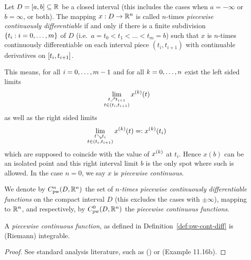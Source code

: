     \begin{definition}\label{def:pw-cont-diff}
        Let $D=[a,b]\subseteq\mathbb{R}$ be a closed interval (this includes the cases when $a=-\infty$ or $b=\infty$, or both). The mapping $x:D\rightarrow\mathbb{R}^n$ is called $n$-times \emph{piecewise continuously differentiable} if and only if there is a finite subdivision $\{t_i:i=0,\ldots,m\}$ of $D$ (i.e.\ $a=t_0<t_1<\ldots<t_m=b$) such that $x$ is $n$-times continuously differentiable on each interval piece $(t_i,t_{i+1})$ with continuable derivatives on $[t_i,t_{i+1}]$.

        This means, for all $i=0,\ldots,m-1$ and for all $k=0,\ldots,n$ exist the left sided limits
        \begin{equation}
            \lim_{\substack{t\upto t_{i+1}\\ t\in(t_i,t_{i+1})}} \D[k]{x}(t)
        \end{equation}
        as well as the right sided limits
        \begin{equation}
            \lim_{\substack{t\downto t_{i}\\ t\in(t_i,t_{i+1})}} \D[k]{x}(t) =: \D[k]{x}(t_i)
        \end{equation}
        which are supposed to coincide with the value of $\D[k]{x}$ at $t_i$.
        Hence $x(b)$ can be an isolated point and this right interval limit $b$ is the only spot where such is allowed.
        In the case $n=0$, we say $x$ is \emph{piecewise continuous}.

        We denote by $\Cnpw[n]{D}{\R^n}$ the set of \emph{$n$-times piecewise continuously differentiable functions} on the compact interval $D$ (this excludes the cases with $\pm\infty$), mapping to $\mathbb{R}^n$, and respectively, by $\Cnpw[0]{D}{\R^n}$ the \emph{piecewise continuous functions}.
    \end{definition}


    \begin{lemma}[]\label{lm:pc-integrable}
        A \emph{piecewise continuous function}, as defined in Definition~\ref{def:pw-cont-diff} is (Riemann) integrable.
    \end{lemma}
    \begin{proof}
        See standard analysis literature, such as \cite{Rudin76PrinciplesAnalysis} () or \cite{Gathmann12GDM} (Example 11.16b).
    \end{proof}

